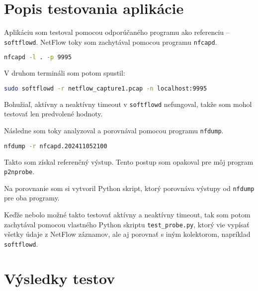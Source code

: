 \documentclass[a4paper, 12pt]{article}
\begin{document}
\newpage
\section{Popis testovania aplikácie}

Aplikáciu som testoval pomocou odporúčaného programu ako referenciu -- \texttt{softflowd}\cite{softflowd}. NetFlow toky som zachytával pomocou programu \texttt{nfcapd}.

\begin{lstlisting}[language=bash]
nfcapd -l . -p 9995        
\end{lstlisting}

V druhom termináli som potom spustil:

\begin{lstlisting}[language=bash]
sudo softflowd -r netflow_capture1.pcap -n localhost:9995
\end{lstlisting}

Bohužiaľ, aktívny a neaktívny timeout v \texttt{softflowd} nefungoval, takže som mohol testovať len predvolené hodnoty.

Následne som toky analyzoval a porovnával pomocou programu \texttt{nfdump}.

\begin{lstlisting}[language=bash]
nfdump -r nfcapd.202411052100
\end{lstlisting}

Takto som získal referenčný výstup. Tento postup som opakoval pre môj program \texttt{p2nprobe}.

Na porovnanie som si vytvoril Python skript, ktorý porovnáva výstupy od \texttt{nfdump} pre oba programy.

Keďže nebolo možné takto testovať aktívny a neaktívny timeout, tak som potom zachytával pomocou vlastného Python skriptu \texttt{test\_probe.py}, ktorý vie vypísať všetky údaje z NetFlow záznamov, ale aj porovnať s iným kolektorom, napríklad \texttt{softflowd}.

\section{Výsledky testov}

\newpage
\end{document}
